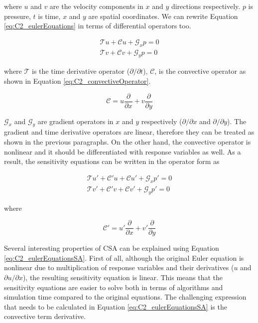 where $u$ and $v$ are the velocity components in $x$ and $y$ directions respectively. $p$ is pressure, $t$ is time, $x$ and $y$ are spatial coordinates. We can rewrite Equation \eqref{eq:C2_eulerEquations} in terms of differential operators too.

\begin{subequations}
\begin{gather*}
	\mathcal{T} u +
	\mathcal{C} u +
	\mathcal{G}_x p = 0 
	\\
	\mathcal{T} v +
	\mathcal{C} v +
	\mathcal{G}_y p = 0 
\end{gather*}
\end{subequations}

where $\mathcal{T}$ is the time derivative operator ($\partial /\partial t$), $\mathcal{C}$, is the convective operator as shown in Equation \eqref{eq:C2_convectiveOperator}.

\begin{equation}\label{eq:C2_convectiveOperator}
	\mathcal{C} = u \frac{\partial}{\partial x} + v \frac{\partial}{\partial y}
\end{equation}

$\mathcal{G}_x$ and $\mathcal{G}_y$ are gradient operators in $x$ and $y$ respectively ($\partial /\partial x$ and $\partial /\partial y$). The gradient and time derivative operators are linear, therefore they can be treated as shown in the previous paragraphs. On the other hand, the convective operator is nonlinear and it should be differentiated with response variables as well. As a result, the sensitivity equations can be written in the operator form as

\begin{subequations}\label{eq:C2_eulerEquationsSA}
\begin{gather}
	\mathcal{T} u' +
	\mathcal{C}' u + \mathcal{C} u' +
	\mathcal{G}_x p' = 0 
	\\
	\mathcal{T} v' +
	\mathcal{C}' v + \mathcal{C} v' +
	\mathcal{G}_y p' = 0 
\end{gather}
\end{subequations}

where

\begin{equation*}
	\mathcal{C}' = u' \frac{\partial}{\partial x} + v' \frac{\partial}{\partial y}
\end{equation*}

Several interesting properties of CSA can be explained using Equation \eqref{eq:C2_eulerEquationsSA}. First of all, although the original Euler equation is nonlinear due to multiplication of response variables and their derivatives ($u$ and $\partial u/\partial x$), the resulting sensitivity equation is linear. This means that the sensitivity equations are easier to solve both in terms of algorithms and simulation time compared to the original equations. The challenging expression that needs to be calculated in Equation \eqref{eq:C2_eulerEquationsSA} is the convective term derivative.

